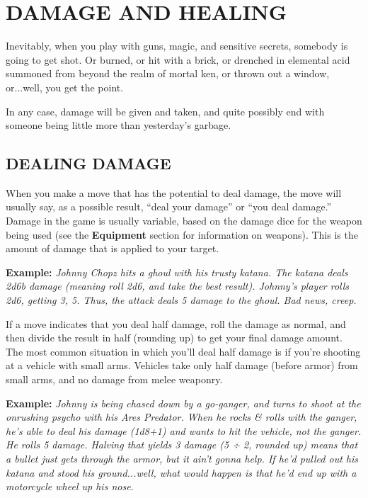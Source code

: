 \documentclass[oneside,10pt]{article}
\begin{document}
\section{DAMAGE AND HEALING}
\begin{multicols}{2}

Inevitably, when you play with guns, magic, and sensitive secrets, somebody is going to get shot. Or burned, or hit with a
brick, or drenched in elemental acid summoned from beyond
the realm of mortal ken, or thrown out a window, or...well,
you get the point.

In any case, damage will be given and taken, and quite possibly end with someone being little more than yesterday’s
garbage.

\subsection{DEALING DAMAGE}

When you make a move that has the potential to deal damage, the move will usually say, as a possible result, “deal
your damage” or “you deal damage.” Damage in the game
is usually variable, based on the damage dice for the weapon
being used (see the \textbf{Equipment} section for information on
weapons). This is the amount of damage that is applied to
your target.

\begin{adjustwidth*}{.5cm}{.5cm}

\textbf{Example:} \textit{Johnny Chopz hits a ghoul with his trusty katana. The katana deals 2d6b damage (meaning roll 2d6, and
take the best result). Johnny’s player rolls 2d6, getting 3,
5. Thus, the attack deals 5 damage to the ghoul. Bad news,
creep.}
\end{adjustwidth*}

If a move indicates that you deal half damage, roll the damage as normal, and then divide the result in half (rounding up) 
to get your final damage amount. 
The most common situation in which you’ll deal half damage 
  is if you’re shooting at a vehicle with small arms. Vehicles 
    take only half damage (before armor) from small arms, and no 
    damage from melee weaponry. 

\begin{adjustwidth*}{.5cm}{.5cm}

\textbf{Example:} \textit{Johnny is being chased down by a go-ganger,
and turns to shoot at the onrushing psycho with his Ares
Predator. When he rocks \& rolls with the ganger, he’s able
to deal his damage (1d8+1) and wants to hit the vehicle,
not the ganger. He rolls 5 damage. Halving that yields 3
damage (5 ÷ 2, rounded up) means that a bullet just gets
through the armor, but it ain’t gonna help. If he’d pulled
out his katana and stood his ground...well, what would
happen is that he’d end up with a motorcycle wheel up
his nose.}
\end{adjustwidth*}


\end{multicols}
\end{document}

